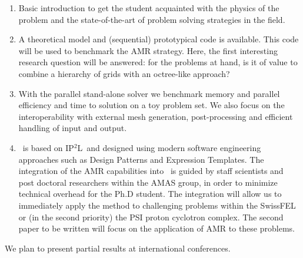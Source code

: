 \documentclass[11pt,pdftex]{article}
\renewcommand{\ippl}{\textsc{IP$^{2}$L}}
\begin{document}
\begin{enumerate}

\item Basic introduction to get the student acquainted with the physics
  of the problem and the state-of-the-art of problem solving strategies
  in the field.

\item A theoretical model and (sequential) prototypical code is
  available.  This code will be used to benchmark the AMR strategy.
  Here, the first interesting research question will be answered: for
  the problems at hand, is it of value to combine a hierarchy of grids
  with an octree-like approach?

\item With the parallel stand-alone solver we benchmark memory and
  parallel efficiency and time to solution on a toy problem set.  We
  also focus on the interoperability with external mesh generation,
  post-processing and efficient handling of input and output.

\item \opal\ is based on \ippl\ and designed using modern software
  engineering approaches such as Design Patterns and Expression
  Templates.  The integration of the AMR capabilities into \opal\ is
  guided by staff scientists and post doctoral researchers within the
  AMAS group, in order to minimize technical overhead for the Ph.D
  student.  The integration will allow us to immediately apply the
  method to challenging problems within the SwissFEL or (in the second
  priority) the PSI proton cyclotron complex.  The second paper to be
  written will focus on the application of AMR to these problems.
\end{enumerate}

We plan to present partial results at international conferences.
\end{document}
